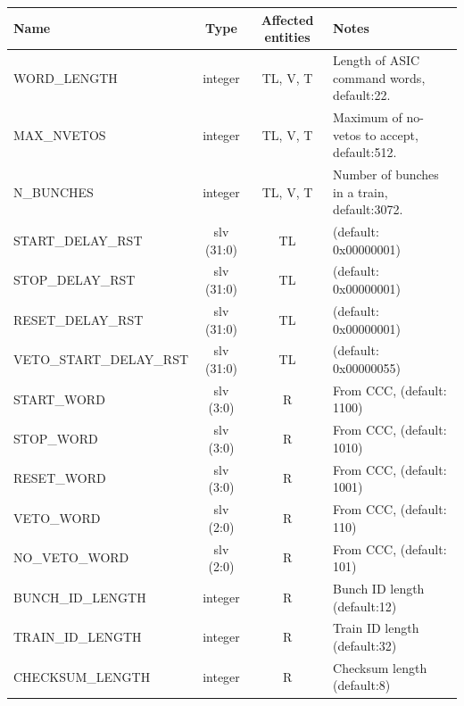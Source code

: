 \begin{table}
  \begin{center}
    \begin{tabulary}{\textwidth}{l| c | c | L}
      Name                       & Type       & Affected entities & Notes \\
      \hline
      WORD\_LENGTH               & integer    & TL, V, T        & Length of ASIC command words, default:22.    \\
      MAX\_NVETOS                & integer    & TL, V, T        & Maximum of no-vetos to accept, default:512.  \\
      N\_BUNCHES                 & integer    & TL, V, T        & Number of bunches in a train, default:3072.  \\ 
      \hline
      START\_DELAY\_RST          & slv (31:0) & TL              & (default: 0x00000001)                \\
      STOP\_DELAY\_RST           & slv (31:0) & TL              & (default: 0x00000001)                \\
      RESET\_DELAY\_RST          & slv (31:0) & TL              & (default: 0x00000001)                \\
      VETO\_START\_DELAY\_RST    & slv (31:0) & TL              & (default: 0x00000055)                \\
      \hline                                                        
      START\_WORD                & slv (3:0)  &  R              & From CCC, (default: 1100)           \\
      STOP\_WORD                 & slv (3:0)  &  R              & From CCC, (default: 1010)           \\
      RESET\_WORD                & slv (3:0)  &  R              & From CCC, (default: 1001)           \\
      VETO\_WORD                 & slv (2:0)  &  R              & From CCC, (default: 110)            \\
      NO\_VETO\_WORD             & slv (2:0)  &  R              & From CCC, (default: 101)            \\
      BUNCH\_ID\_LENGTH          & integer    &  R              & Bunch ID length (default:12)        \\
      TRAIN\_ID\_LENGTH          & integer    &  R              & Train ID length (default:32)        \\
      CHECKSUM\_LENGTH           & integer    &  R              & Checksum length (default:8)         \\

\end{tabulary}
\end{center}
\end{table}
